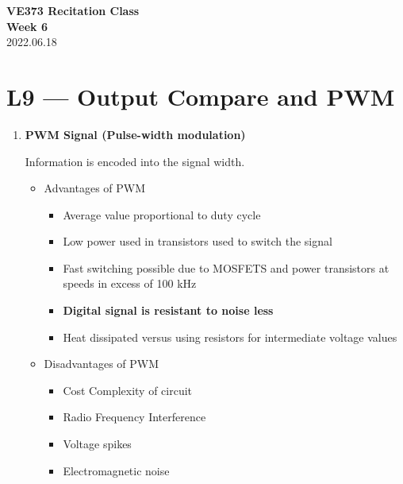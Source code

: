 \documentclass[a4paper]{article}
\begin{document}
\renewcommand{\thesection}{\Roman{section}}
\renewcommand{\thesubsection}{\Alph{subsection}}
\renewcommand{\thesubsubsection}{\thesubsection.\arabic{subsubsection}}
\renewcommand{\d}{\: \mathrm{d}}
\newcommand{\e}{\mathrm{e}}

\begin{center}
  \textbf{\Large VE373 Recitation Class}\\[1em]
  \textbf{\large Week 6} \\[1em]
  2022.06.18 \\[1em]
\end{center}

\section*{L9 --- Output Compare and PWM}
  \begin{enumerate}[label = \arabic*.]
    \item \textbf{PWM Signal (Pulse-width modulation)}
      \par Information is encoded into the signal width.
      \begin{itemize}[leftmargin = 1cm]
        \item Advantages of PWM
          \begin{itemize}[leftmargin = 1cm]
            \item Average value proportional to duty cycle
            \item Low power used in transistors used to switch the signal
            \item Fast switching possible due to MOSFETS and power transistors at speeds in excess of 100 kHz
            \item \textbf{Digital signal is resistant to noise less}
            \item Heat dissipated versus using resistors for intermediate voltage values
          \end{itemize}
        \item Disadvantages of PWM
          \begin{itemize}[leftmargin = 1cm]
            \item Cost Complexity of circuit
            \item Radio Frequency Interference
            \item Voltage spikes
            \item Electromagnetic noise
          \end{itemize}
      \end{itemize}


\end{enumerate}
\end{document}
